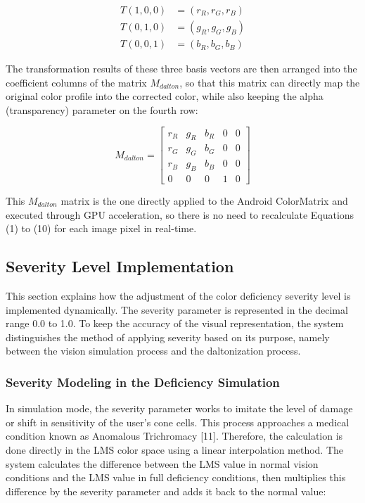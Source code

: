 \begin{equation}
\begin{aligned}
T(1,0,0) &= (r_R, r_G, r_B) \\
T(0,1,0) &= (g_R, g_G, g_B) \\
T(0,0,1) &= (b_R, b_G, b_B)
\end{aligned}
\end{equation}

The transformation results of these three basis vectors are then arranged into the coefficient columns of the matrix $M_{dalton}$, so that this matrix can directly map the original color profile into the corrected color, while also keeping the alpha (transparency) parameter on the fourth row:

\begin{equation}
M_{dalton} =
\begin{bmatrix}
r_R & g_R & b_R & 0 & 0 \\
r_G & g_G & b_G & 0 & 0 \\
r_B & g_B & b_B & 0 & 0 \\
0 & 0 & 0 & 1 & 0
\end{bmatrix}
\end{equation}

This $M_{dalton}$ matrix is the one directly applied to the Android ColorMatrix and executed through GPU acceleration, so there is no need to recalculate Equations (1) to (10) for each image pixel in real-time.

\subsection{Severity Level Implementation}

This section explains how the adjustment of the color deficiency severity level is implemented dynamically. The severity parameter is represented in the decimal range 0.0 to 1.0. To keep the accuracy of the visual representation, the system distinguishes the method of applying severity based on its purpose, namely between the vision simulation process and the daltonization process.

\subsubsection{Severity Modeling in the Deficiency Simulation}

In simulation mode, the severity parameter works to imitate the level of damage or shift in sensitivity of the user's cone cells. This process approaches a medical condition known as Anomalous Trichromacy [11]. Therefore, the calculation is done directly in the LMS color space using a linear interpolation method. The system calculates the difference between the LMS value in normal vision conditions and the LMS value in full deficiency conditions, then multiplies this difference by the severity parameter and adds it back to the normal value:

